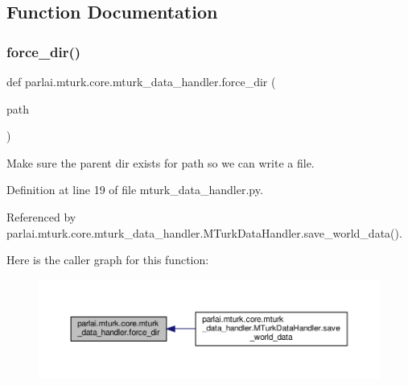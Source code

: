 \subsection{Function Documentation}
\mbox{\label{namespaceparlai_1_1mturk_1_1core_1_1mturk__data__handler_a28ec50366a486cded72d95c9be461c2f}} 
\subsubsection{\texorpdfstring{force\+\_\+dir()}{force\_dir()}}
{\footnotesize\ttfamily def parlai.\+mturk.\+core.\+mturk\+\_\+data\+\_\+handler.\+force\+\_\+dir (\begin{DoxyParamCaption}\item[{}]{path }\end{DoxyParamCaption})}

\begin{DoxyVerb}Make sure the parent dir exists for path so we can write a file.\end{DoxyVerb}
 

Definition at line 19 of file mturk\+\_\+data\+\_\+handler.\+py.



Referenced by parlai.\+mturk.\+core.\+mturk\+\_\+data\+\_\+handler.\+M\+Turk\+Data\+Handler.\+save\+\_\+world\+\_\+data().

Here is the caller graph for this function\+:
\nopagebreak
\begin{figure}[H]
\begin{center}
\leavevmode
\includegraphics[width=350pt]{namespaceparlai_1_1mturk_1_1core_1_1mturk__data__handler_a28ec50366a486cded72d95c9be461c2f_icgraph}
\end{center}
\end{figure}


